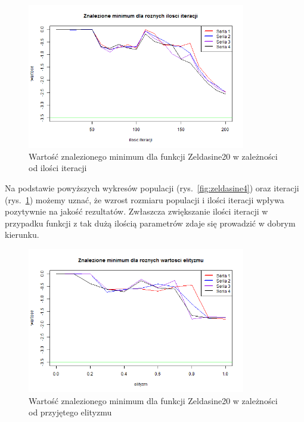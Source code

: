 \documentclass[11pt, a4paper]{article}
\newcommand{\fbi}{\leavevmode{\parindent=1em\indent}}
\begin{document}
\begin{figure}[H]
	\begin{center}
		\includegraphics[width=0.85\textwidth]{./assets/Zeldasine205.png}
		\caption{Wartość znalezionego minimum dla funkcji Zeldasine20 w zależności od ilości iteracji}
		\label{fig:zeldasine5}
	\end{center}
\end{figure}

\fbi
Na podstawie powyższych wykresów populacji (rys.~\ref{fig:zeldasine4}) oraz iteracji (rys.~\ref{fig:zeldasine5}) możemy uznać, że wzrost rozmiaru populacji i ilości iteracji wpływa pozytywnie na jakość rezultatów. Zwłaszcza zwiększanie ilości iteracji w przypadku funkcji z tak dużą ilością parametrów zdaje się prowadzić w dobrym kierunku.

\begin{figure}[H]
	\begin{center}
		\includegraphics[width=0.85\textwidth]{./assets/Zeldasine206.png}
		\caption{Wartość znalezionego minimum dla funkcji Zeldasine20 w zależności od przyjętego elityzmu}
		\label{fig:zeldasine6}
	\end{center}
\end{figure}
\end{document}
